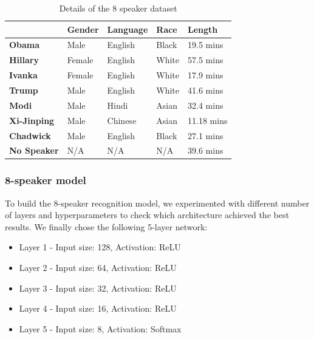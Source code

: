 \documentclass[10pt,twocolumn,letterpaper]{article}
\begin{document}
\begin{table}[h]
    \begin{tabular}{l|l|l|l|l|}
    \cline{2-5}
                                                    & \textbf{Gender} & \textbf{Language} & \textbf{Race} & \textbf{Length} \\ \hline
    \multicolumn{1}{|l|}{\textbf{Obama}}            & Male            & English           & Black         & 19.5 mins       \\ \hline
    \multicolumn{1}{|l|}{\textbf{Hillary}}          & Female          & English           & White         & 57.5 mins       \\ \hline
    \multicolumn{1}{|l|}{\textbf{Ivanka}}           & Female          & English           & White         & 17.9 mins       \\ \hline
    \multicolumn{1}{|l|}{\textbf{Trump}}            & Male            & English           & White         & 41.6 mins       \\ \hline
    \multicolumn{1}{|l|}{\textbf{Modi}}             & Male            & Hindi             & Asian         & 32.4 mins       \\ \hline
    \multicolumn{1}{|l|}{\textbf{Xi-Jinping}}       & Male            & Chinese           & Asian         & 11.18 mins      \\ \hline
    \multicolumn{1}{|l|}{\textbf{Chadwick}}         & Male            & English           & Black         & 27.1 mins       \\ \hline
    \multicolumn{1}{|l|}{\textbf{No Speaker}}       & N/A             & N/A               & N/A           & 39.6 mins       \\ \hline
    \end{tabular}
    \caption{Details of the 8 speaker dataset}
    \label{tab:8-speaker-dataset}
\end{table}

\subsubsection{8-speaker model}

To build the 8-speaker recognition model, we experimented with different number of layers and hyperparameters to check which architecture achieved the best results. We finally chose the following 5-layer network:

\begin{itemize}[itemsep=-5pt]
    \item Layer 1 - Input size: 128, Activation: ReLU
    \item Layer 2 - Input size: 64, Activation: ReLU
    \item Layer 3 - Input size: 32, Activation: ReLU
    \item Layer 4 - Input size: 16, Activation: ReLU
    \item Layer 5 - Input size: 8, Activation: Softmax
\end{itemize}
\end{document}
